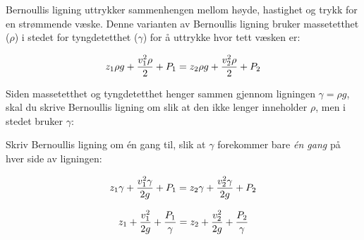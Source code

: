 

Bernoullis ligning uttrykker sammenhengen mellom høyde, hastighet og trykk for en strømmende væske. Denne varianten av Bernoullis ligning bruker massetetthet ($\rho$) i stedet for tyngdetetthet ($\gamma$) for å uttrykke hvor tett væsken er:

$$z_1 \rho g + {v_1^2 \rho \over 2} + P_1 = z_2 \rho g + {v_2^2 \rho \over 2} + P_2$$

Siden massetetthet og tyngdetetthet henger sammen gjennom ligningen $\gamma = \rho g$, skal du skrive Bernoullis ligning om slik at den ikke lenger inneholder $\rho$, men i stedet bruker $\gamma$:

\vskip 100pt

Skriv Bernoullis ligning om én gang til, slik at $\gamma$ forekommer bare {\it én gang} på hver side av ligningen:

\vskip 100pt







$$z_1 \gamma + {v_1^2 \gamma \over 2g} + P_1 = z_2 \gamma + {v_2^2 \gamma \over 2g} + P_2$$

$$z_1 + {v_1^2 \over 2g} + {P_1 \over \gamma} = z_2 + {v_2^2 \over 2g} + {P_2 \over \gamma}$$










